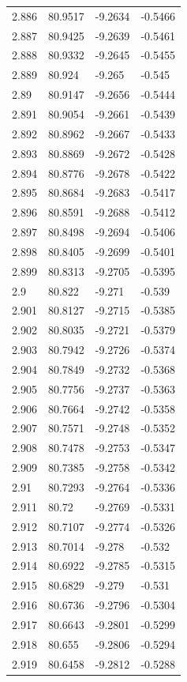 \begin{tabular}{llll}
2.886 & 80.9517 & -9.2634 & -0.5466 \\
2.887 & 80.9425 & -9.2639 & -0.5461 \\
2.888 & 80.9332 & -9.2645 & -0.5455 \\
2.889 & 80.924 & -9.265 & -0.545 \\
2.89 & 80.9147 & -9.2656 & -0.5444 \\
2.891 & 80.9054 & -9.2661 & -0.5439 \\
2.892 & 80.8962 & -9.2667 & -0.5433 \\
2.893 & 80.8869 & -9.2672 & -0.5428 \\
2.894 & 80.8776 & -9.2678 & -0.5422 \\
2.895 & 80.8684 & -9.2683 & -0.5417 \\
2.896 & 80.8591 & -9.2688 & -0.5412 \\
2.897 & 80.8498 & -9.2694 & -0.5406 \\
2.898 & 80.8405 & -9.2699 & -0.5401 \\
2.899 & 80.8313 & -9.2705 & -0.5395 \\
2.9 & 80.822 & -9.271 & -0.539 \\
2.901 & 80.8127 & -9.2715 & -0.5385 \\
2.902 & 80.8035 & -9.2721 & -0.5379 \\
2.903 & 80.7942 & -9.2726 & -0.5374 \\
2.904 & 80.7849 & -9.2732 & -0.5368 \\
2.905 & 80.7756 & -9.2737 & -0.5363 \\
2.906 & 80.7664 & -9.2742 & -0.5358 \\
2.907 & 80.7571 & -9.2748 & -0.5352 \\
2.908 & 80.7478 & -9.2753 & -0.5347 \\
2.909 & 80.7385 & -9.2758 & -0.5342 \\
2.91 & 80.7293 & -9.2764 & -0.5336 \\
2.911 & 80.72 & -9.2769 & -0.5331 \\
2.912 & 80.7107 & -9.2774 & -0.5326 \\
2.913 & 80.7014 & -9.278 & -0.532 \\
2.914 & 80.6922 & -9.2785 & -0.5315 \\
2.915 & 80.6829 & -9.279 & -0.531 \\
2.916 & 80.6736 & -9.2796 & -0.5304 \\
2.917 & 80.6643 & -9.2801 & -0.5299 \\
2.918 & 80.655 & -9.2806 & -0.5294 \\
2.919 & 80.6458 & -9.2812 & -0.5288 \\

\end{tabular}
